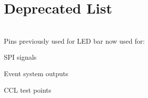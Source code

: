 \chapter{Deprecated List }
\hypertarget{deprecated}{}\label{deprecated}

\begin{DoxyRefList}
\item[{\parbox[t]{\linewidth}{File \doxylink{_l_e_d___bar_8h}{LED\+\_\+\+Bar.h} }}]\hfill \\
\label{deprecated__deprecated000001}%
%
Pins previously used for LED bar now used for:\+
\begin{DoxyItemize}
\item SPI signals
\item Event system outputs
\item CCL test points
\end{DoxyItemize}
\end{DoxyRefList}